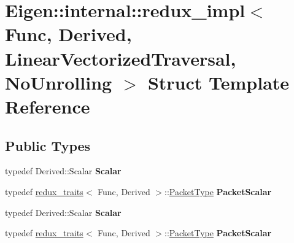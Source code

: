 \hypertarget{struct_eigen_1_1internal_1_1redux__impl_3_01_func_00_01_derived_00_01_linear_vectorized_traversal_00_01_no_unrolling_01_4}{}\section{Eigen\+:\+:internal\+:\+:redux\+\_\+impl$<$ Func, Derived, Linear\+Vectorized\+Traversal, No\+Unrolling $>$ Struct Template Reference}
\label{struct_eigen_1_1internal_1_1redux__impl_3_01_func_00_01_derived_00_01_linear_vectorized_traversal_00_01_no_unrolling_01_4}
\subsection*{Public Types}
\begin{DoxyCompactItemize}
\item 
\mbox{\label{struct_eigen_1_1internal_1_1redux__impl_3_01_func_00_01_derived_00_01_linear_vectorized_traversal_00_01_no_unrolling_01_4_a534ce85756f72b2d52b59a59bbd939a0}} 
typedef Derived\+::\+Scalar {\bfseries Scalar}
\item 
\mbox{\label{struct_eigen_1_1internal_1_1redux__impl_3_01_func_00_01_derived_00_01_linear_vectorized_traversal_00_01_no_unrolling_01_4_a23870bd1c8fb4a12f46f4e32480a2251}} 
typedef \hyperlink{struct_eigen_1_1internal_1_1redux__traits}{redux\+\_\+traits}$<$ Func, Derived $>$\+::\hyperlink{struct_eigen_1_1_packet_type}{Packet\+Type} {\bfseries Packet\+Scalar}
\item 
\mbox{\label{struct_eigen_1_1internal_1_1redux__impl_3_01_func_00_01_derived_00_01_linear_vectorized_traversal_00_01_no_unrolling_01_4_a534ce85756f72b2d52b59a59bbd939a0}} 
typedef Derived\+::\+Scalar {\bfseries Scalar}
\item 
\mbox{\label{struct_eigen_1_1internal_1_1redux__impl_3_01_func_00_01_derived_00_01_linear_vectorized_traversal_00_01_no_unrolling_01_4_a23870bd1c8fb4a12f46f4e32480a2251}} 
typedef \hyperlink{struct_eigen_1_1internal_1_1redux__traits}{redux\+\_\+traits}$<$ Func, Derived $>$\+::\hyperlink{struct_eigen_1_1_packet_type}{Packet\+Type} {\bfseries Packet\+Scalar}
\end{DoxyCompactItemize}
